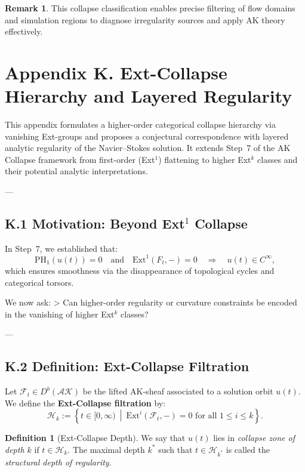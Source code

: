 \documentclass[11pt]{article}
\theoremstyle{definition}
\newtheorem{definition}[theorem]{Definition}
\newtheorem{remark}[theorem]{Remark}
\begin{document}
\begin{remark}
This collapse classification enables precise filtering of flow domains and simulation regions  
to diagnose irregularity sources and apply AK theory effectively.
\end{remark}





\section*{Appendix K. Ext-Collapse Hierarchy and Layered Regularity}

This appendix formulates a higher-order categorical collapse hierarchy via vanishing Ext-groups and proposes a conjectural correspondence with layered analytic regularity of the Navier--Stokes solution.  
It extends Step~7 of the AK Collapse framework from first-order (Ext$^1$) flattening to higher Ext$^k$ classes and their potential analytic interpretations.

---

\subsection*{K.1 Motivation: Beyond Ext$^1$ Collapse}

In Step~7, we established that:
\[
\mathrm{PH}_1(u(t)) = 0 \quad \text{and} \quad \mathrm{Ext}^1(F_t, -) = 0 \quad \Rightarrow \quad u(t) \in C^\infty,
\]
which ensures smoothness via the disappearance of topological cycles and categorical torsors.

We now ask:
> Can higher-order regularity or curvature constraints be encoded in the vanishing of higher Ext$^k$ classes?

---

\subsection*{K.2 Definition: Ext-Collapse Filtration}

Let \( \mathcal{F}_t \in D^b(\mathcal{AK}) \) be the lifted AK-sheaf associated to a solution orbit \( u(t) \).  
We define the \textbf{Ext-Collapse filtration} by:
\[
\mathcal{H}_k := \left\{ t \in [0, \infty) \ \middle| \ \mathrm{Ext}^i(\mathcal{F}_t, -) = 0 \text{ for all } 1 \leq i \leq k \right\}.
\]

\begin{definition}[Ext-Collapse Depth]
We say that \( u(t) \) lies in \emph{collapse zone of depth \( k \)} if \( t \in \mathcal{H}_k \).  
The maximal depth \( k^\ast \) such that \( t \in \mathcal{H}_{k^\ast} \) is called the \emph{structural depth of regularity}.
\end{definition}
\end{document}
